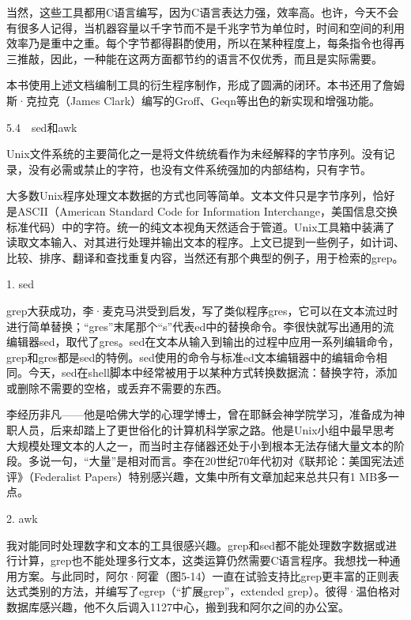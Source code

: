 \documentclass[a4paper,12pt,UTF8,twoside]{ctexbook}
\begin{document}
{{当然，这些工具都用C语言编写，因为C语言表达力强，效率高。也许，今天不会有很多人记得，当机器容量以千字节而不是千兆字节为单位时，时间和空间的利用效率乃是重中之重。每个字节都得斟酌使用，所以在某种程度上，每条指令也得再三推敲，因此，一种能在这两方面都节约的语言不仅优秀，而且是实际需要。

本书使用上述文档编制工具的衍生程序制作，形成了圆满的闭环。本书还用了詹姆斯·克拉克（James Clark）编写的Groff、Geqn等出色的新实现和增强功能。





5.4　sed和awk


Unix文件系统的主要简化之一是将文件统统看作为未经解释的字节序列。没有记录，没有必需或禁止的字符，也没有文件系统强加的内部结构，只有字节。

大多数Unix程序处理文本数据的方式也同等简单。文本文件只是字节序列，恰好是ASCII（American Standard Code for Information Interchange，美国信息交换标准代码）中的字符。统一的纯文本视角天然适合于管道。Unix工具箱中装满了读取文本输入、对其进行处理并输出文本的程序。上文已提到一些例子，如计词、比较、排序、翻译和查找重复内容，当然还有那个典型的例子，用于检索的grep。





1. sed


grep大获成功，李·麦克马洪受到启发，写了类似程序gres，它可以在文本流过时进行简单替换；“gres”末尾那个“s”代表ed中的替换命令。李很快就写出通用的流编辑器sed，取代了gres。sed在文本从输入到输出的过程中应用一系列编辑命令，grep和gres都是sed的特例。sed使用的命令与标准ed文本编辑器中的编辑命令相同。今天，sed在shell脚本中经常被用于以某种方式转换数据流：替换字符，添加或删除不需要的空格，或丢弃不需要的东西。

李经历非凡——他是哈佛大学的心理学博士，曾在耶稣会神学院学习，准备成为神职人员，后来却踏上了更世俗化的计算机科学家之路。他是Unix小组中最早思考大规模处理文本的人之一，而当时主存储器还处于小到根本无法存储大量文本的阶段。多说一句，“大量”是相对而言。李在20世纪70年代初对《联邦论：美国宪法述评》（Federalist Papers）特别感兴趣，文集中所有文章加起来总共只有1 MB多一点。





2. awk


我对能同时处理数字和文本的工具很感兴趣。grep和sed都不能处理数字数据或进行计算，grep也不能处理多行文本，这类运算仍然需要C语言程序。我想找一种通用方案。与此同时，阿尔·阿霍（图5-14）一直在试验支持比grep更丰富的正则表达式类别的方法，并编写了egrep（“扩展grep”，extended grep）。彼得·温伯格对数据库感兴趣，他不久后调入1127中心，搬到我和阿尔之间的办公室。



}}
\end{document}
